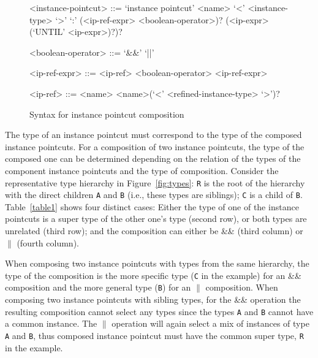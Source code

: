 \documentclass{acm_proc_article-sp}
\begin{document}
\begin{figure}[h]
\begin{grammar}
<instance-pointcut> ::= `instance pointcut' <name> `<' <instance-type> `>' `:'
(<ip-ref-expr> <boolean-operator>)? (<ip-expr> (`UNTIL' <ip-expr>)?)? 

<boolean-operator> ::= `&&' \alt `||'

<ip-ref-expr> ::= <ip-ref>  <boolean-operator> <ip-ref-expr> 

<ip-ref> ::= <name> \alt <name>(`<' <refined-instance-type> `>')?

\end{grammar}
\caption{Syntax for instance pointcut composition}
\label{fig:grammar2}
\end{figure}


The type of an instance pointcut must correspond to the type of the composed instance pointcuts. For a composition of two instance pointcuts, the type of the composed one can be determined depending on the relation of the types of the component instance pointcuts and the type of composition. Consider the representative type hierarchy in Figure~\ref{fig:types}: \lstinline{R} is the root of the hierarchy with the direct children \lstinline{A} and \lstinline{B} (i.e., these types are siblings); \lstinline{C} is a child of \lstinline{B}. Table~\ref{table1} shows four distinct cases: Either the type of one of the instance pointcuts is a super type of the other one's type (second row), or both types are unrelated (third row); and the composition can either be \&\& (third column) or $\|$ (fourth column).

When composing two instance pointcuts with types from the same hierarchy, the type of the composition is the more specific type (\lstinline{C} in the example) for an \&\& composition and the more general type (\lstinline{B}) for an $\|$ composition.
When composing two instance pointcuts with sibling types, for the \&\& operation the resulting composition cannot select any types since the types \lstinline{A} and \lstinline{B} cannot have a common instance. The $\|$ operation will again select a mix of instances of type \lstinline{A} and \lstinline{B}, thus composed instance pointcut must have the common super type, \lstinline{R} in the example.
\end{document}
